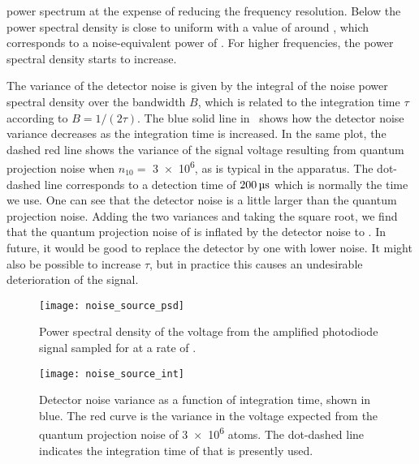 power spectrum at the expense of reducing the frequency resolution.
Below  the power spectral density is close
to uniform with a value of around
, which corresponds to a
noise-equivalent power of .
For higher frequencies, the power spectral density starts to
increase. 
\par\noindent
The variance of the detector noise is given by the integral of the
noise power spectral density over the bandwidth $B$, which is related
to the integration time $\tau$ according to $B = 1/(2
\tau)$\sivalue{}{\hertz}. The blue solid line
in~ shows how the detector noise
variance decreases as the integration time is increased. In the same
plot, the dashed red line shows the variance of the signal voltage
resulting from quantum projection noise when $n_{10} =$ \num{3e6}, as
is typical in the apparatus. 
The
dot-dashed line corresponds to a detection time of
$\sivalue{200}{\micro\s}$ which is normally the time we use. One can
see that the detector noise is a little larger than the quantum
projection noise. Adding the two variances and taking the square root,
we find that the quantum projection noise of 
is inflated by the detector noise to . In
future, it would be good to replace the detector by one with lower
noise. It might also be possible to increase $\tau$, but in practice
this causes an undesirable deterioration of the signal.
\begin{figure}[htpb!]
  \centering
  \texttt{[image: noise\_source\_psd]}
  \caption[Power spectral density of the amplified photodiode voltage.]{Power spectral density
    of the voltage from the amplified photodiode signal
  sampled for  at a rate of
.  
}
  \label{fig:noise_source_psd}
\end{figure}
\begin{figure}[htpb!]
  \centering
  \texttt{[image: noise\_source\_int]}
  \caption[Detector noise vs. integration time.]{Detector noise
    variance as a function of integration time, shown in blue. The red
    curve is the variance in the voltage expected from the quantum
    projection noise of \num{3e6} atoms. The dot-dashed line indicates
    the integration time of  that is presently
  used.}
  \label{fig:noise_source_int}
\end{figure}


